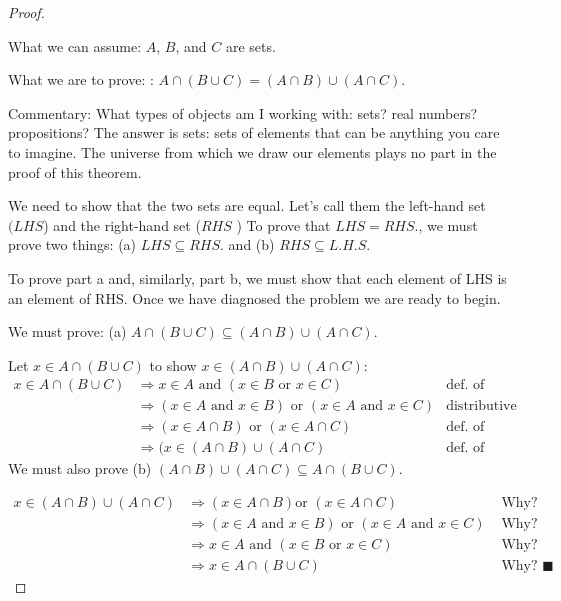 \documentclass[10pt,]{book}
\theoremstyle{plain}
\theoremstyle{definition}
\theoremstyle{definition}
\theoremstyle{definition}
\begin{document}
\begin{proof}\hypertarget{proof-1}{}
What we can assume: \(A\), \(B\), and \(C\) are sets.%
\par
What we are to prove: : \(A\cap  (B \cup  C) = (A\cap B) \cup  (A \cap  C)\).%
\par
Commentary: What types of objects am I working with: sets? real numbers? propositions? The answer is sets: sets of elements
that can be anything you care to imagine. The universe from which we draw our elements plays no part in the proof of this theorem.%
\par
We need to show that the two sets are equal. Let's call them the left-hand set \((LHS\)) and the right-hand set (\(RHS\) ) To prove that \(LHS = RHS\)., we must prove two things: (a) \(LHS\subseteq RHS\). and (b) \(RHS\subseteq L.H.S\).%
\par
To prove part a and, similarly, part b, we must show that each element of LHS is an element of RHS.  Once we have diagnosed the problem we are ready to begin.%
\par
We must prove:
(a) \(A \cap  (B \cup  C)\subseteq (A\cap B) \cup  (A\cap C)\).%
\par

Let \(x \in  A\cap (B \cup  C)\) to show \(x\in (A\cap B) \cup  (A \cap C)\):
\begin{equation*}
\begin{split}
x \in A \cap (B \cup C) & \Rightarrow x\in A \textrm{ and } (x\in B\textrm{ or } x\in C)& \textrm{def. of union and intersection}\\
& \Rightarrow  (x \in A\textrm{ and }x\in B)\textrm{ or } (x\in A\textrm{ and }x\in C) &\textrm{distributive law of logic}\\
& \Rightarrow  (x \in A \cap B) \textrm{ or } (x \in A \cap C) &\textrm{def. of intersection}\\
& \Rightarrow  (x \in (A \cap B) \cup (A \cap C) &\textrm{def. of union}
 \end{split}
\end{equation*}
We must also prove (b) \((A\cap B) \cup  (A\cap C)\subseteq A \cap  (B \cup  C)\).%
\par
\begin{equation*}
\begin{split}
x\in (A\cap B) \cup  (A \cap C)& \Rightarrow  (x\in A\cap B)\text{or } (x\in A\cap C)&\textrm{ Why? } \\
			& \Rightarrow (x\in A\textrm{ and }x\in B)\textrm{ or } (x\in A\textrm{ and }x\in C)&\textrm{ Why? }\\
			&\Rightarrow  x\in A \textrm{ and } (x\in B\textrm{ or }x\in C)&\textrm{ Why? }\\
			&\Rightarrow x\in A\cap (B\cup C)&\textrm{ Why? } \blacksquare
\end{split}
 \end{equation*}%
\end{proof}
\end{document}
